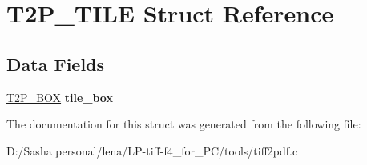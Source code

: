 \hypertarget{struct_t2_p___t_i_l_e}{}\section{T2\+P\+\_\+\+T\+I\+L\+E Struct Reference}
\label{struct_t2_p___t_i_l_e}
\subsection*{Data Fields}
\begin{DoxyCompactItemize}
\item 
\hypertarget{struct_t2_p___t_i_l_e_a36b6a15f8e8420ff8a28d4925f4440c3}{}\hyperlink{struct_t2_p___b_o_x}{T2\+P\+\_\+\+B\+O\+X} {\bfseries tile\+\_\+box}\label{struct_t2_p___t_i_l_e_a36b6a15f8e8420ff8a28d4925f4440c3}

\end{DoxyCompactItemize}


The documentation for this struct was generated from the following file\+:\begin{DoxyCompactItemize}
\item 
D\+:/\+Sasha personal/lena/\+L\+P-\/tiff-\/f4\+\_\+for\+\_\+\+P\+C/tools/tiff2pdf.\+c\end{DoxyCompactItemize}
